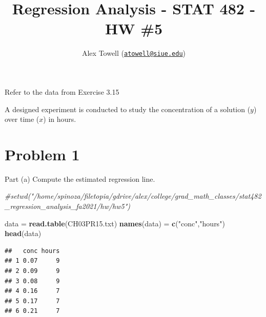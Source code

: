 \documentclass[
]{article}
\title{Regression Analysis - STAT 482 - HW \#5}
\author{Alex Towell
(\href{mailto:atowell@siue.edu}{\nolinkurl{atowell@siue.edu}})}
\date{}
\newenvironment{Shaded}{\begin{snugshade}}{\end{snugshade}}
\newcommand{\CommentTok}[1]{\textcolor[rgb]{0.56,0.35,0.01}{\textit{#1}}}
\newcommand{\FunctionTok}[1]{\textcolor[rgb]{0.13,0.29,0.53}{\textbf{#1}}}
\newcommand{\NormalTok}[1]{#1}
\newcommand{\OtherTok}[1]{\textcolor[rgb]{0.56,0.35,0.01}{#1}}
\newcommand{\StringTok}[1]{\textcolor[rgb]{0.31,0.60,0.02}{#1}}
\begin{document}
\maketitle

\newcommand{\sse}{\operatorname{SS_E}}
\newcommand{\sspe}{\operatorname{SS_{PE}}}
\newcommand{\sslf}{\operatorname{SS_{LF}}}
\newcommand{\mspe}{\operatorname{MS_{PE}}}
\newcommand{\mslf}{\operatorname{MS_{LF}}}
\newcommand{\ssto}{\operatorname{SSTO}}
\newcommand{\ssx}{\operatorname{SS_X}}
\newcommand{\ssr}{\operatorname{SS_R}}
\newcommand{\msr}{\operatorname{MS_R}}
\newcommand{\mse}{\operatorname{MS_E}}
\newcommand{\var}{\operatorname{V}}
\newcommand{\sd}{\operatorname{sd}}
\newcommand{\expect}{\operatorname{E}}
\newcommand{\corr}{\operatorname{cor}}
\newcommand{\cov}{\operatorname{cov}}
\newcommand{\se}{\operatorname{se}}
\newcommand{\mat}[1]{\mathbf{#1}}
\newcommand{\eval}[2]{\left. #1 \right\vert_{#2}}
\newcommand{\dfe}{\operatorname{df_E}}

Refer to the data from Exercise 3.15

A designed experiment is conducted to study the concentration of a
solution (\(y\)) over time (\(x\)) in hours.

\hypertarget{problem-1}{%
\section{Problem 1}\label{problem-1}}

\begin{tcolorbox}[split=\f]
Part (a)
\tcblower
Compute the estimated regression line.
\end{tcolorbox}

\begin{Shaded}
\begin{Highlighting}[]
\CommentTok{\#setwd("/home/spinoza/filetopia/gdrive/alex/college/grad\_math\_classes/stat482\_regression\_analysis\_fa2021/hw/hw5")}

\NormalTok{data }\OtherTok{=} \FunctionTok{read.table}\NormalTok{(}\StringTok{\textquotesingle{}CH03PR15.txt\textquotesingle{}}\NormalTok{)}
\FunctionTok{names}\NormalTok{(data) }\OtherTok{=} \FunctionTok{c}\NormalTok{(}\StringTok{"conc"}\NormalTok{,}\StringTok{"hours"}\NormalTok{)}
\FunctionTok{head}\NormalTok{(data)}
\end{Highlighting}
\end{Shaded}

\begin{verbatim}
##   conc hours
## 1 0.07     9
## 2 0.09     9
## 3 0.08     9
## 4 0.16     7
## 5 0.17     7
## 6 0.21     7
\end{verbatim}
\end{document}
